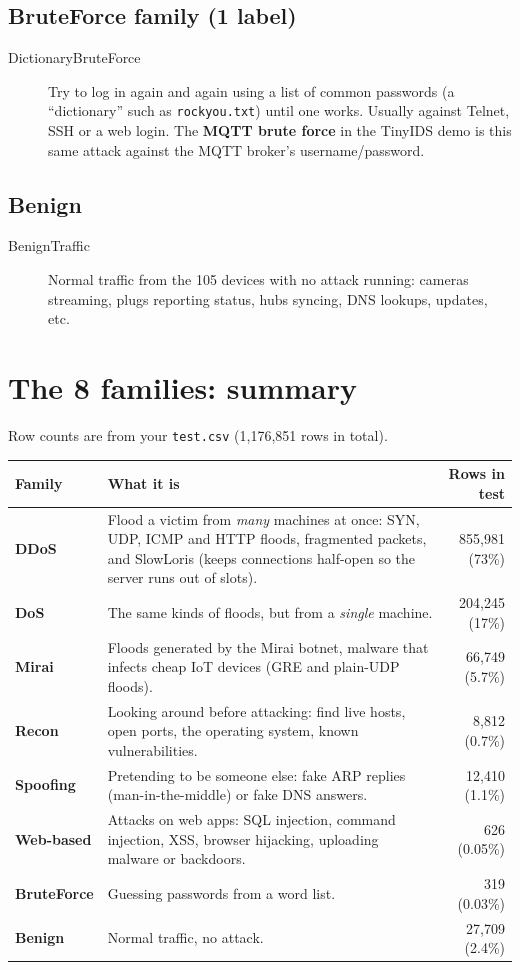 \documentclass[11pt]{article}
\begin{document}
\subsection*{BruteForce family (1 label)}
\begin{description}
\item[DictionaryBruteForce] Try to log in again and again using a list of common passwords (a ``dictionary'' such as \texttt{rockyou.txt}) until one works. Usually against Telnet, SSH or a web login. The \textbf{MQTT brute force} in the TinyIDS demo is this same attack against the MQTT broker's username/password.
\end{description}

\subsection*{Benign}
\begin{description}
\item[BenignTraffic] Normal traffic from the 105 devices with no attack running: cameras streaming, plugs reporting status, hubs syncing, DNS lookups, updates, etc.
\end{description}

\newpage
\section*{The 8 families: summary}

Row counts are from your \texttt{test.csv} (1{,}176{,}851 rows in total).

\begin{tabularx}{\textwidth}{@{}>{\bfseries}l X r@{}}
\toprule
Family & What it is & Rows in test \\
\midrule
DDoS & Flood a victim from \emph{many} machines at once: SYN, UDP, ICMP and HTTP floods, fragmented packets, and SlowLoris (keeps connections half-open so the server runs out of slots). & 855{,}981 (73\%) \\
DoS & The same kinds of floods, but from a \emph{single} machine. & 204{,}245 (17\%) \\
Mirai & Floods generated by the Mirai botnet, malware that infects cheap IoT devices (GRE and plain-UDP floods). & 66{,}749 (5.7\%) \\
Recon & Looking around before attacking: find live hosts, open ports, the operating system, known vulnerabilities. & 8{,}812 (0.7\%) \\
Spoofing & Pretending to be someone else: fake ARP replies (man-in-the-middle) or fake DNS answers. & 12{,}410 (1.1\%) \\
Web-based & Attacks on web apps: SQL injection, command injection, XSS, browser hijacking, uploading malware or backdoors. & 626 (0.05\%) \\
BruteForce & Guessing passwords from a word list. & 319 (0.03\%) \\
Benign & Normal traffic, no attack. & 27{,}709 (2.4\%) \\
\bottomrule
\end{tabularx}
\end{document}
